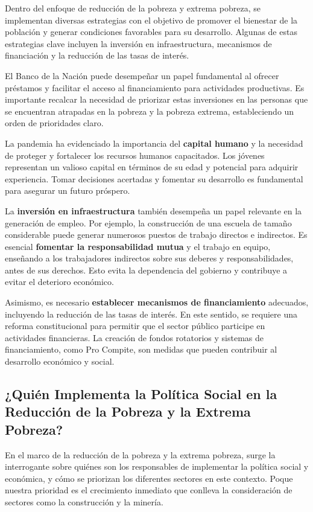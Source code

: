 \documentclass[
  a4paper,
]{article}
\begin{document}
Dentro del enfoque de reducción de la pobreza y extrema pobreza, se
implementan diversas estrategias con el objetivo de promover el
bienestar de la población y generar condiciones favorables para su
desarrollo. Algunas de estas estrategias clave incluyen la inversión en
infraestructura, mecanismos de financiación y la reducción de las tasas
de interés.

El Banco de la Nación puede desempeñar un papel fundamental al ofrecer
préstamos y facilitar el acceso al financiamiento para actividades
productivas. Es importante recalcar la necesidad de priorizar estas
inversiones en las personas que se encuentran atrapadas en la pobreza y
la pobreza extrema, estableciendo un orden de prioridades claro.

La pandemia ha evidenciado la importancia del \textbf{capital humano} y
la necesidad de proteger y fortalecer los recursos humanos capacitados.
Los jóvenes representan un valioso capital en términos de su edad y
potencial para adquirir experiencia. Tomar decisiones acertadas y
fomentar su desarrollo es fundamental para asegurar un futuro próspero.

La \textbf{inversión en infraestructura} también desempeña un papel
relevante en la generación de empleo. Por ejemplo, la construcción de
una escuela de tamaño considerable puede generar numerosos puestos de
trabajo directos e indirectos. Es esencial \textbf{fomentar la
responsabilidad mutua} y el trabajo en equipo, enseñando a los
trabajadores indirectos sobre sus deberes y responsabilidades, antes de
sus derechos. Esto evita la dependencia del gobierno y contribuye a
evitar el deterioro económico.

Asimismo, es necesario \textbf{establecer mecanismos de financiamiento}
adecuados, incluyendo la reducción de las tasas de interés. En este
sentido, se requiere una reforma constitucional para permitir que el
sector público participe en actividades financieras. La creación de
fondos rotatorios y sistemas de financiamiento, como Pro Compite, son
medidas que pueden contribuir al desarrollo económico y social.

\subsection{¿Quién Implementa la Política Social en la Reducción de la
Pobreza y la Extrema
Pobreza?}\label{quiuxe9n-implementa-la-poluxedtica-social-en-la-reducciuxf3n-de-la-pobreza-y-la-extrema-pobreza}

En el marco de la reducción de la pobreza y la extrema pobreza, surge la
interrogante sobre quiénes son los responsables de implementar la
política social y económica, y cómo se priorizan los diferentes sectores
en este contexto. Poque nuestra prioridad es el crecimiento inmediato
que conlleva la consideración de sectores como la construcción y la
minería.
\end{document}
